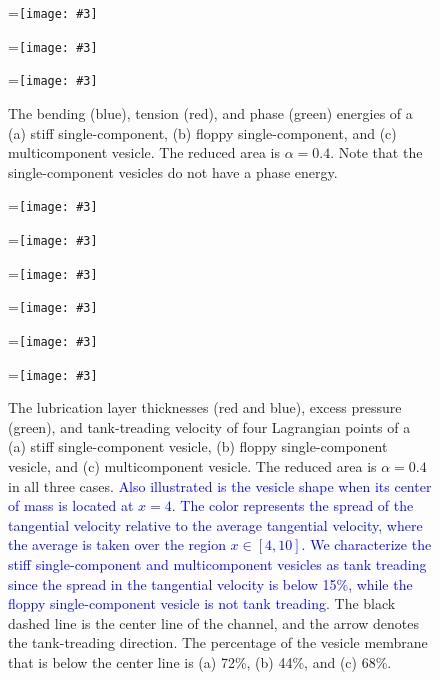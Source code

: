 \documentclass[twoside,twocolumn,9pt]{article}
\newcommand{\subfigimg}[3][,]{%
  \setbox1=\hbox{\texttt{[image: \#3]}}%
  \leavevmode\rlap{\usebox1}%
  \rlap{\hspace*{0pt}\raisebox{\dimexpr\ht1-0\baselineskip}{\bf
  \normalsize #2}}%
  \phantom{\usebox1}%
}
\begin{document}
\begin{figure}[ht]
  \centering
  \subfigimg[width=0.3\linewidth]{(a)}{figures/SC_energy.pdf}
  \subfigimg[width=0.3\linewidth]{(b)}{figures/SCp55_energy.pdf}
  \subfigimg[width=0.3\linewidth]{(c)}{figures/MCp5_energy.pdf}
  \caption{\label{fig:Energy} \small The bending (blue), tension (red),
  and phase (green) energies of a (a) stiff single-component, (b)
  floppy single-component, and (c) multicomponent vesicle. The reduced
  area is $\alpha = 0.4$. Note that the single-component vesicles do not
  have a phase energy.} 
\end{figure}
\begin{figure}[ht]
  \centering
  \subfigimg[width=0.3\linewidth]{(a)}{figures/Layer_Size_RAp4_SC.pdf}
  \subfigimg[width=0.3\linewidth]{(b)}{figures/Layer_Size_RAp4_SCp55.pdf}
  \subfigimg[width=0.3\linewidth]{(c)}{figures/Layer_Size_RAp4_MCp5.pdf}
  \subfigimg[width=0.3\linewidth,trim=4cm 20cm 33cm 7cm,clip=true]{}
    {figures/SC_treading_velocity2.pdf}
  \subfigimg[width=0.3\linewidth,trim=4cm 20cm 33cm 7cm,clip=true]{}
    {figures/SCp55_treading_velocity2.pdf}
  \subfigimg[width=0.3\linewidth,trim=4cm 20cm 33cm 7cm,clip=true]{}
    {figures/MCp5_treading_velocity2.pdf}
  \caption{\label{fig:lubricationComposite} \small The lubrication layer
  thicknesses (red and blue), excess pressure (green), and
  tank-treading velocity of four Lagrangian points of a (a) stiff
  single-component vesicle, (b) floppy single-component vesicle, and (c)
  multicomponent vesicle. The reduced area is $\alpha = 0.4$ in all
  three cases. 
  \textcolor{blue}{
  Also illustrated is the vesicle shape when its center of mass is
  located at $x=4$. The color represents the spread of the tangential
  velocity relative to the average tangential velocity, where the
  average is taken over the region $x \in [4,10]$. We characterize the
  stiff single-component and multicomponent vesicles as tank treading
  since the spread in the tangential velocity is below 15\%, while the
  floppy single-component vesicle is not tank treading.
  }
  The black dashed line is the center line of the channel, and the arrow
  denotes the tank-treading direction. The percentage of the vesicle
  membrane that is below the center line is (a) 72\%, (b) 44\%, and (c)
  68\%.}
\end{figure}
\end{document}
